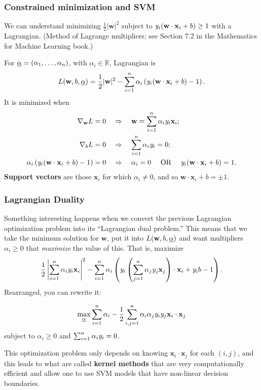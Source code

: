 \documentclass[smaller]{beamer}
\theoremstyle{example}
\newcommand{\x}{\textbf{x}}
\newcommand{\ix}[1]{{\it #1}}
\begin{document}
\begin{frame}
\frametitle{Constrained minimization and SVM}
We can understand minimizing $\frac12|\textbf{w}|^2$ subject to $\ix y_i(\textbf{w}\cdot{\x}_i + b) \ge 1$ with a Lagrangian. (Method of Lagrange multipliers; see Section 7.2 in the Mathematics for Machine Learning book.)

\pause
For $\emph{\alpha}=(\alpha_1,\ldots,\alpha_n)$, with $\alpha_i\in\mathbb R$, Lagrangian is 
    \[L(\textbf{w}, b, \emph{\alpha}) = \frac12|\textbf{w}|^2 - \sum_{i=1}^n\alpha_i\left(\ix y_i(\textbf{w}\cdot\x_i + b) - 1\right).\]
\pause
It is minimized when 
    \begin{align*}
        \nabla_{\textbf{w}}L = 0  &\quad\Rightarrow\quad \textbf{w} = \sum_{i=1}^n\alpha_i\ix y_i\x_i; \\
        \nabla_{b}L = 0  &\quad\Rightarrow\quad \sum_{i=1}^n\alpha_i\ix y_i = 0; \\ 
        \alpha_i\left(\ix y_i(\textbf{w}\cdot\x_i + b)-1\right) = 0 &\quad\Rightarrow\quad 
         \alpha_i = 0 \quad\text{ OR }\quad \ix y_i(\textbf{w}\cdot\x_i + b) = 1.
    \end{align*}
\pause
\textbf{Support vectors} are those $\x_i$ for which $\alpha_i\ne0$, and so $\textbf{w}\cdot\x_i + b = \pm 1$.
\end{frame}

\begin{frame}
\frametitle{Lagrangian Duality}
Something interesting happens when we convert the previous Lagrangian optimization problem into its ``Lagrangian dual problem.'' This means that we take the minimum solution for $\textbf{w}$, put it into $L(\textbf{w},b,\emph{\alpha})$ and want multipliers $\alpha_i\ge 0$ that \textit{maximize} the value of this. That is, maximize 
    \[\frac12\left|\sum_{i=1}^n\alpha_i\ix y_i\x_i\right|^2 - \sum_{i=1}^n\alpha_i\left(\ix y_i\left(\sum_{j=1}^n\alpha_j\ix y_j\x_j\right)\cdot\x_i + \ix y_ib - 1\right).\]
\pause
Rearranged, you can rewrite it:

    \[\max_{\emph{\alpha}} \sum_{i=1}^n\alpha_i - \frac12\sum_{i,j=1}^n\alpha_i\alpha_j\ix y_i\ix y_j \x_i\cdot\x_j\]
subject to $\alpha_i\ge 0$ and $\sum_{i=1}^n\alpha_i\ix y_i = 0$.

\pause
This optimization problem only depends on knowing $\x_i\cdot\x_j$ for each $(i,j)$, and this leads to what are called \textbf{kernel methods} that are very computationally efficient and allow one to use SVM models that have non-linear decision boundaries. 
\end{frame}
\end{document}
